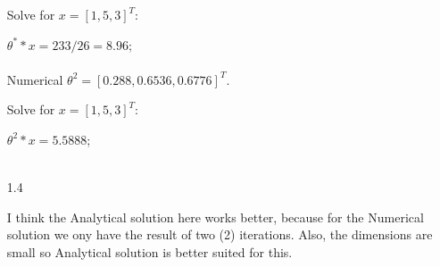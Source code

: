 \documentclass[12pt]{article}
\begin{document}
\begin{enumerate}
  Solve for $x = [1, 5, 3]^T$:

  $\theta^* * x = 233/26 = 8.96$; \\ \\

  Numerical $\theta^2 = [0.288, 0.6536, 0.6776]^T$.
  
  Solve for $x = [1, 5, 3]^T$:
  
  $\theta^2 * x = 5.5888$; \\ \\

  \item[1.4]

  I think the Analytical solution here works better,
  because for the Numerical solution we ony have the result
  of two (2) iterations. Also, the dimensions are small so Analytical
  solution is better suited for this.


\end{enumerate}
\end{document}

